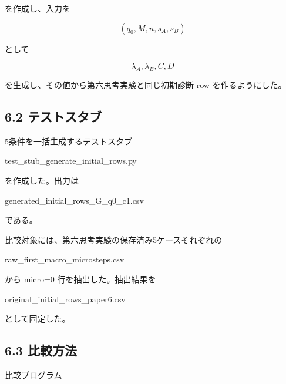 \documentclass[
  a4paper,
]{ltjsarticle}
\newenvironment{Shaded}{}{}
\newcommand{\NormalTok}[1]{#1}
\begin{document}
を作成し、入力を

\[
(q_0,M,n,s_A,s_B)
\]

として

\[
\lambda_A,\lambda_B,C,D
\]

を生成し、その値から第六思考実験と同じ初期診断 row を作るようにした。

\subsection{6.2
テストスタブ}\label{ux30c6ux30b9ux30c8ux30b9ux30bfux30d6}

5条件を一括生成するテストスタブ

\begin{Shaded}
\begin{Highlighting}[]
\NormalTok{test\_stub\_generate\_initial\_rows.py}
\end{Highlighting}
\end{Shaded}

を作成した。出力は

\begin{Shaded}
\begin{Highlighting}[]
\NormalTok{generated\_initial\_rows\_G\_q0\_c1.csv}
\end{Highlighting}
\end{Shaded}

である。

比較対象には、第六思考実験の保存済み5ケースそれぞれの

\begin{Shaded}
\begin{Highlighting}[]
\NormalTok{raw\_first\_macro\_microsteps.csv}
\end{Highlighting}
\end{Shaded}

から micro=0 行を抽出した。抽出結果を

\begin{Shaded}
\begin{Highlighting}[]
\NormalTok{original\_initial\_rows\_paper6.csv}
\end{Highlighting}
\end{Shaded}

として固定した。

\subsection{6.3 比較方法}\label{ux6bd4ux8f03ux65b9ux6cd5}

比較プログラム
\end{document}
